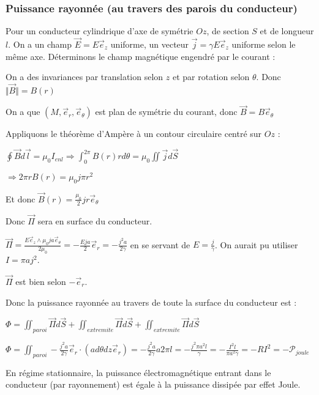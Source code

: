 \documentclass[a4paper,12pt]{book}
\begin{document}
\subsubsection{Puissance rayonnée (au travers des parois du conducteur)}
Pour un conducteur cylindrique d'axe de symétrie $Oz$, de section $S$ et de longueur $l$. On a un champ $\vec{E} = E\vec{e}_z$ uniforme, un vecteur $\vec{j} = \gamma E\vec{e}_z$ uniforme selon le même axe. Déterminons le champ magnétique engendré par le courant :
\par On a des invariances par translation selon $z$ et par rotation selon $\theta$. Donc $\Vert\vec{B}\Vert = B(r)$ \par On a que $(M,\vec{e}_r,\vec{e}_\theta)$ est plan de symétrie du courant, donc $\vec{B} = B\vec{e}_\theta$
\par Appliquons le théorème d'Ampère à un contour circulaire centré sur $Oz$ :\par $\oint \vec{B}d\vec{l} = \mu_0I_{enl} \Rightarrow \int_0^{2\pi}B(r)rd\theta = \mu_0\iint\vec{j}d\vec{S}$ \par $ \Rightarrow 2\pi rB(r) = \mu_0j\pi r^2$ \par Et donc $\vec{B}(r) = \frac{\mu_0}{2}jr\vec{e}_\theta$ \par Donc $\vec{\Pi}$ sera en surface du conducteur.
\par $\vec{\Pi} = \frac{E\vec{e}_z\wedge\mu_0ja\vec{e}_\theta}{2\mu_0} = -\frac{Eja}{2}\vec{e}_r = -\frac{j^2a}{2\gamma}$ en se servant de $E = \frac{j}{\gamma}$. On aurait pu utiliser $I = \pi aj^2$. \par $\vec{\Pi}$ est bien selon $-\vec{e}_r$. \par Donc la puissance rayonnée au travers de toute la surface du conducteur est : \par $\Phi=\iint_{paroi} \vec{\Pi}d\vec{S} + \iint_{extremite} \vec{\Pi}d\vec{S} + \iint_{extremite}\vec{\Pi}d\vec{S}$
\par $\Phi = \iint_{paroi}-\frac{j^2a}{2\gamma}\vec{e}_r\cdot(ad\theta dz\vec{e}_r) = -\frac{j^2a}{2\gamma}a2\pi l = -\frac{j^2\pi a^2l}{\gamma} = -\frac{I^2 l}{\pi a^2\gamma} = -RI^2 = -\mathcal{P}_{joule}$
\par En régime stationnaire, la puissance électromagnétique entrant dans le conducteur (par rayonnement) est égale à la puissance dissipée par effet Joule.
\end{document}
